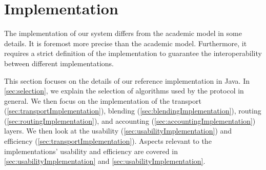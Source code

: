 
\part{Implementation}\label{sec:implementation}
The implementation of our system differs from the academic model in some details. It is foremost more precise than the academic model. Furthermore, it requires a strict definition of the implementation to guarantee the interoperability between different implementations.

This section focuses on the details of our reference implementation in Java. In \cref{sec:selection}, we explain the selection of algorithms used by the protocol in general. We then focus on the implementation of the transport (\cref{sec:transportImplementation}), blending (\cref{sec:blendingImplementation}), routing (\cref{sec:routingImplementation}), and accounting (\cref{sec:accountingImplementation}) layers. We then look at the usability (\cref{sec:usabilityImplementation}) and efficiency (\cref{sec:transportImplementation}). Aspects relevant to the implementations' usability and efficiency are covered in \cref{sec:usabilityImplementation} and \cref{sec:usabilityImplementation}.

